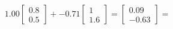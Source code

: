\documentclass[preview]{standalone}
\begin{document}
\begin{align*}
1.00 \begin{bmatrix} 0.8 \\ 0.5 \end{bmatrix} + -0.71 \begin{bmatrix} 1 \\ 1.6 \end{bmatrix} = \begin{bmatrix} 0.09 \\ -0.63 \end{bmatrix} =
\end{align*}
\end{document}
